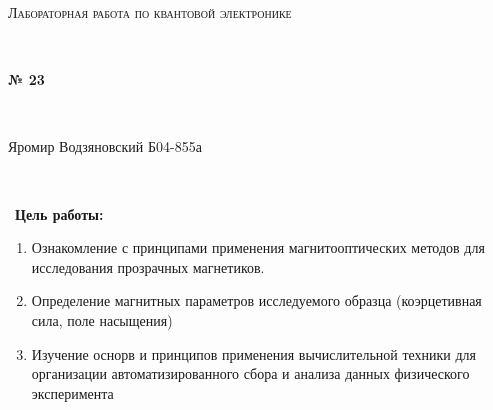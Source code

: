 \documentclass[a4paper]{article}
\begin{document}
\graphicspath{ {pictures/} }
\begin{center}
    {\scshape\Large Лабораторная работа по квантовой электронике} \par

    \

    {\huge\bfseries № 23} \par 

    \

    {\large Яромир Водзяновский Б04-855а}
\end{center}

\

\
\textbf{Цель работы:} \par 
\begin{enumerate}
    \item Ознакомление с принципами применения магнитооптических методов для исследования прозрачных магнетиков. 
    \item Определение магнитных параметров исследуемого образца (коэрцетивная сила, поле насыщения)
    \item Изучение оснорв и принципов применения вычислительной техники для организации  автоматизированного сбора и анализа данных физического эксперимента
\end{enumerate}
\end{document}
